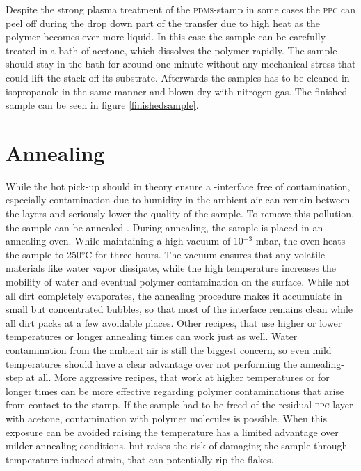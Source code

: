Despite the strong plasma treatment of the \textsc{pdms}-stamp in some cases the \textsc{ppc} can peel off during the drop down part of the transfer due to high heat as the polymer becomes ever more liquid. In this case the sample can be carefully treated in a bath of acetone, which dissolves the polymer rapidly. The sample should stay in the bath for around one minute without any mechanical stress that could lift the stack off its substrate. Afterwards the samples has to be cleaned in isopropanole in the same manner and blown dry with nitrogen gas. The finished sample can be seen in figure \ref{finishedsample}.

\section{Annealing}

While the hot pick-up should in theory ensure a \hbn-\tmdg interface free of contamination, especially contamination due to humidity in the ambient air can remain between the layers and seriously lower the quality of the sample. To remove this pollution, the sample can be annealed \cite{lin_graphene_2012}. During annealing, the sample is placed in an annealing oven. While maintaining a high vacuum of 10$^{-3}$ mbar, the oven heats the sample to 250°C for three hours. The vacuum ensures that any volatile materials like water vapor dissipate, while the high temperature increases the mobility of water and eventual polymer contamination on the surface. While not all dirt completely evaporates, the annealing procedure makes it accumulate in small but concentrated bubbles, so that most of the interface remains clean while all dirt packs at a few avoidable places. Other recipes, that use higher or lower temperatures or longer annealing times can work just as well. Water contamination from the ambient air is still the biggest concern, so even mild temperatures should have a clear advantage over not performing the annealing-step at all. 
More aggressive recipes, that work at higher temperatures or for longer times can be more effective regarding polymer contaminations that arise from contact to the stamp. If the sample had to be freed of the residual \textsc{ppc} layer with acetone, contamination with polymer molecules is possible. When this exposure can be avoided raising the temperature has a limited advantage over milder annealing conditions, but raises the risk of damaging the sample through temperature induced strain, that can potentially rip the \tmdg flakes. 

